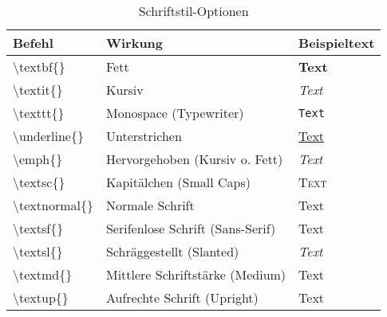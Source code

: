 \begin{table}[H]
    \centering
    \begin{tabular}{lll}
        \toprule
        \textbf{Befehl}               & \textbf{Wirkung}                 & \textbf{Beispieltext} \\
        \midrule
        \textbackslash textbf\{\}     & Fett                             & \textbf{Text}         \\
        \textbackslash textit\{\}     & Kursiv                           & \textit{Text}         \\
        \textbackslash texttt\{\}     & Monospace (Typewriter)           & \texttt{Text}         \\
        \textbackslash underline\{\}  & Unterstrichen                    & \underline{Text}      \\
        \textbackslash emph\{\}       & Hervorgehoben (Kursiv o. Fett)   & \emph{Text}           \\
        \textbackslash textsc\{\}     & Kapitälchen (Small Caps)         & \textsc{Text}         \\
        \textbackslash textnormal\{\} & Normale Schrift                  & \textnormal{Text}     \\
        \textbackslash textsf\{\}     & Serifenlose Schrift (Sans-Serif) & \textsf{Text}         \\
        \textbackslash textsl\{\}     & Schräggestellt (Slanted)         & \textsl{Text}         \\
        \textbackslash textmd\{\}     & Mittlere Schriftstärke (Medium)  & \textmd{Text}         \\
        \textbackslash textup\{\}     & Aufrechte Schrift (Upright)      & \textup{Text}         \\
        \bottomrule
    \end{tabular}
    \caption{Schriftstil-Optionen}
    \label{tab:schriftstile}
\end{table}